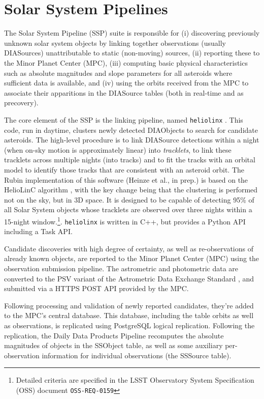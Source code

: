 \section{Solar System Pipelines}
\label{sec:solsys}

The Solar System Pipeline (SSP) suite is responsible for (i) discovering
previously unknown solar system objects by linking together observations
(usually DIASources) unattributable to static (non-moving) sources, (ii)
reporting these to the Minor Planet Center (MPC), (iii) computing basic
physical characteristics such as absolute magnitudes and slope parameters
for all asteroids where sufficient data is available, and (iv) using the
orbits received from the MPC to associate their apparitions in the DIASource
tables (both in real-time and as precovery).

The core element of the SSP is the linking pipeline, named {\tt heliolinx}
\citep{heliolinx}.  This code, run in daytime, clusters newly detected
DIAObjects to search for candidate asteroids.  The high-level procedure is
to link DIASource detections within a night (when on-sky motion is
approximately linear) into {\em tracklets}, to link these tracklets across
multiple nights (into tracks) and to fit the tracks with an orbital model to
identify those tracks that are consistent with an asteroid orbit.  The Rubin
implementation of this software (Heinze et al., in prep.) is based on the
HelioLinC algorithm \citep{2018AJ....156..135H}, with the key change being
that the clustering is performed not on the sky, but in 3D space.  It is
designed to be capable of detecting 95\% of all Solar System objects whose
tracklets are observed over three nights within a 15-night
window.\footnote{Detailed criteria are specified in the LSST Observatory
System Specification (OSS) document {\tt OSS-REQ-0159}}. {\tt heliolinx} is
written in C++, but provides a Python API including a Task API.

Candidate discoveries with high degree of certainty, as well as
re-observations of already known objects, are reported to the Minor Planet
Center (MPC) using the observation submission pipeline.  The astrometric
and photometric data are converted to the PSV variant of the Astrometric
Data Exchange Standard \citep[ADES;][]{2017DPS....4911214C}, and submitted
via a HTTPS POST API provided by the MPC.

Following processing and validation of newly reported candidates, they're
added to the MPC's central database.  This database, including the table
orbits as well as observations, is replicated using PostgreSQL logical
replication.  Following the replication, the Daily Data Products Pipeline
recomputes the absolute magnitudes of objects in the SSObject table, as well
as some auxiliary per-observation information for individual observations
(the SSSource table).

